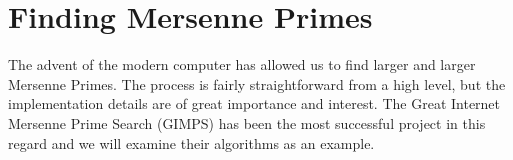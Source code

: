 
\section{Finding Mersenne Primes}
The advent of the modern computer has allowed us to find larger and larger Mersenne Primes.  The process is fairly straightforward from a high level, but the implementation details are of great importance and interest. The Great Internet Mersenne Prime Search (GIMPS) has been the most successful project in this regard and we will examine their algorithms as an example.   
